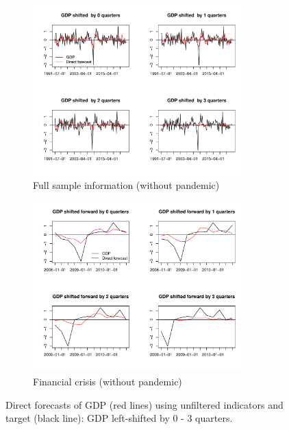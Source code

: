 \documentclass[11pt,a4paper]{article}
\begin{document}
\begin{figure}[htbp]

 \begin{subfigure}[htpb]{\textwidth}
        \begin{center}
             \includegraphics[width=0.9\textwidth]{./Figures/direct_wc_all.pdf}
            \caption{Full sample information (without pandemic)\label{fig:direct_wc}}
        \end{center}
    \end{subfigure}

 \begin{subfigure}[htpb]{\textwidth}
        \begin{center}
            \includegraphics[width=0.9\textwidth]{./Figures/direct_wc_financial_crisis.pdf}
            \caption{Financial crisis (without pandemic)\label{fig:direct_wc_financial_crisis}}
        \end{center}
    \end{subfigure}
    \caption{Direct forecasts of GDP (red lines) using unfiltered indicators and target (black line): GDP left-shifted  by 0 - 3 quarters.}\label{fig:direct_forecast}
\end{figure}
\end{document}
